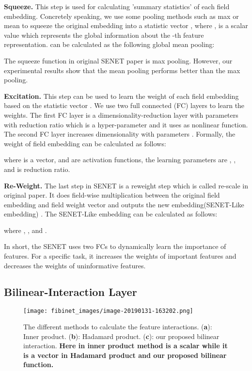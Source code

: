\documentclass[sigconf]{acmart}
\begin{document}
\noindent\textbf{Squeeze.} This step is used for calculating 'summary statistics'
of each field embedding. Concretely speaking, we use some pooling
methods such as max or mean to squeeze the original embedding
 into a statistic vector
, where
,  is a scalar value which represents the
global information about the -th feature representation. 
can be calculated as the following global mean pooling:


The squeeze function in original SENET paper\cite{hu2017squeeze} is max pooling. However,
our experimental results show that the mean pooling performs better than
the max pooling. 

\noindent\textbf{Excitation.} This step can be used to learn the weight of each
field embedding based on the statistic vector . We use two full
connected (FC) layers to learn the weights. The first FC layer is a
dimensionality-reduction layer with parameters  with reduction
ratio  which is a hyper-parameter and it uses  as
nonlinear function. The second FC layer increases dimensionality with
parameters . Formally, the weight of field embedding can be
calculated as follows:

where  is a vector,  and  are
activation functions, the learning parameters are
,
, and  is reduction ratio.

\noindent\textbf{Re-Weight.} The last step in SENET is a reweight step which is
called re-scale in original paper\cite{hu2017squeeze}. It does field-wise multiplication
between the original field embedding  and field weight vector  and
outputs the new embedding(SENET-Like embedding)
. The SENET-Like embedding 
can be calculated as follows:

where , , and  .

In short, the SENET uses two FCs to dynamically learn the importance of features.
For a specific task, it increases the weights of important
features and decreases the weights of uninformative features.

\subsection{Bilinear-Interaction Layer}

\begin{figure}
\centering
\texttt{[image: fibinet\_images/image-20190131-163202.png]}
\caption{The different methods to calculate the feature
interactions. (\textbf{a}): Inner product. (\textbf{b}): Hadamard
product. (\textbf{c}): our proposed bilinear interaction. \textbf{Here
 in inner product method is a scalar while it is a vector in
Hadamard product and our proposed bilinear function.}}
\label{fig:f3}
\end{figure}
\end{document}

